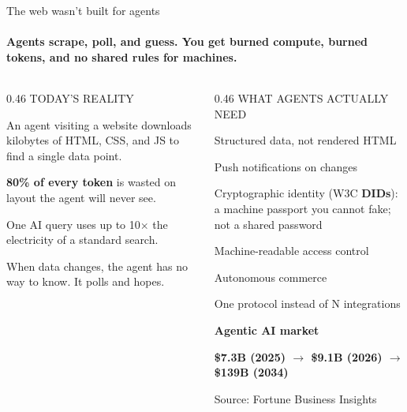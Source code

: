 \documentclass[aspectratio=169,10pt]{beamer}
\newcommand{\hi}[1]{\textcolor{accent}{\textbf{#1}}}
\newcommand{\cmark}{\textcolor{mint}{\ding{51}}}
\newcommand{\badge}[2]{\colorbox{#1!15!bg}{\footnotesize\textcolor{#1}{\textbf{#2}}}}
\begin{document}
\begin{frame}[shrink=5]{The web wasn't built for agents}
\framesubtitle{Agents scrape, poll, and guess. You get burned compute, burned tokens, and no shared rules for machines.}

\vspace{0.15cm}

\begin{columns}[T]
\begin{column}{0.46\textwidth}
{\footnotesize\color{rose} TODAY'S REALITY}\par
\vspace{5pt}
{\small\color{txtm}%
An agent visiting a website downloads kilobytes of HTML, CSS, and JS to find a single data point.\par
\vspace{4pt}
\hi{80\% of every token} is wasted on layout the agent will never see.\par
\vspace{4pt}
One AI query uses up to 10$\times$ the electricity of a standard search.\par
\vspace{4pt}
When data changes, the agent has no way to know. It polls and hopes.%
}
\end{column}

\begin{column}{0.46\textwidth}
{\footnotesize\color{mint} WHAT AGENTS ACTUALLY NEED}\par
\vspace{5pt}
{\small\color{txtm}%
\cmark\; Structured data, not rendered HTML\par
\vspace{3pt}
\cmark\; Push notifications on changes\par
\vspace{3pt}
\cmark\; Cryptographic identity (W3C \textbf{DIDs}): {\color{slate}\footnotesize a machine passport you cannot fake; not a shared password}\par
\vspace{3pt}
\cmark\; Machine-readable access control\par
\vspace{3pt}
\cmark\; Autonomous commerce\par
\vspace{3pt}
\cmark\; One protocol instead of N integrations\par
}
\vspace{6pt}
{\footnotesize\color{amber}\textbf{Agentic AI market}}\par
\vspace{2pt}
\badge{amber}{\$7.3B (2025) \;$\to$\; \$9.1B (2026) \;$\to$\; \$139B (2034)}\par
\vspace{2pt}
{\scriptsize\color{slate} Source: Fortune Business Insights}
\end{column}
\end{columns}


\end{frame}
\end{document}
